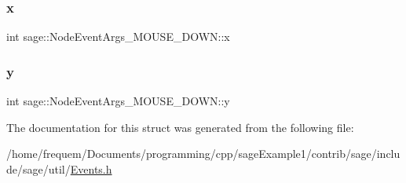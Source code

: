 \subsubsection{\texorpdfstring{x}{x}}
{\footnotesize\ttfamily int sage\+::\+Node\+Event\+Args\+\_\+\+M\+O\+U\+S\+E\+\_\+\+D\+O\+W\+N\+::x}

\mbox{\label{structsage_1_1NodeEventArgs__MOUSE__DOWN_a7ebb1ccfb770abb65962563ad9f6becd}} 
\subsubsection{\texorpdfstring{y}{y}}
{\footnotesize\ttfamily int sage\+::\+Node\+Event\+Args\+\_\+\+M\+O\+U\+S\+E\+\_\+\+D\+O\+W\+N\+::y}



The documentation for this struct was generated from the following file\+:\begin{DoxyCompactItemize}
\item 
/home/frequem/\+Documents/programming/cpp/sage\+Example1/contrib/sage/include/sage/util/\mbox{\hyperlink{Events_8h}{Events.\+h}}\end{DoxyCompactItemize}
